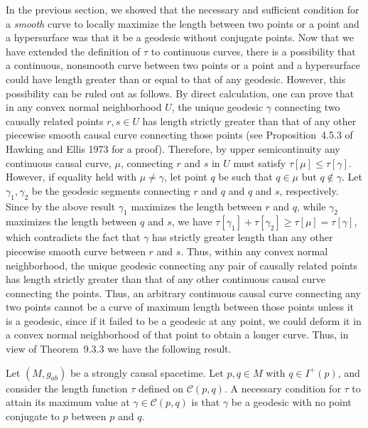 In the previous section, we showed that the necessary and sufficient condition for a
\emph{smooth} curve to locally maximize the length between two points or a point and a
hypersurface was that it be a geodesic without conjugate points. Now that we have
extended the definition of \(\tau\) to continuous curves, there is a possibility that a
continuous, nonsmooth curve between two points or a point and a hypersurface could
have length greater than or equal to that of any geodesic. However, this possibility
can be ruled out as follows. By direct calculation, one can prove that in any convex
normal neighborhood \(U\), the unique geodesic \(\gamma\) connecting two causally
related points \(r,s\in U\) has length strictly greater than that of any other piecewise
smooth causal curve connecting those points (see Proposition~4.5.3 of Hawking and
Ellis 1973 for a proof). Therefore, by upper semicontinuity any continuous causal
curve, \(\mu\), connecting \(r\) and \(s\) in \(U\) must satisfy
\(\tau[\mu]\leq\tau[\gamma]\). However, if equality held with \(\mu\ne\gamma\), let
point \(q\) be such that \(q\in\mu\) but \(q\notin\gamma\). Let \(\gamma_1,\gamma_2\)
be the geodesic segments connecting \(r\) and \(q\) and \(q\) and \(s\), respectively.
Since by the above result \(\gamma_1\) maximizes the length between \(r\) and \(q\),
while \(\gamma_2\) maximizes the length between \(q\) and \(s\), we have
\(\tau[\gamma_1]+\tau[\gamma_2]\geq\tau[\mu]=\tau[\gamma]\), which contradicts the
fact that \(\gamma\) has strictly greater length than any other piecewise smooth curve
between \(r\) and \(s\). Thus, within any convex normal neighborhood, the unique
geodesic connecting any pair of causally related points has length strictly greater
than that of any other continuous causal curve connecting the points. Thus, an
arbitrary continuous causal curve connecting any two points cannot be a curve of
maximum length between those points unless it is a geodesic, since if it failed to be
a geodesic at any point, we could deform it in a convex normal neighborhood of that
point to obtain a longer curve. Thus, in view of Theorem~9.3.3 we have the following
result.

\begin{theorem}\label{thm:9.4.2}
Let \((M,g_{ab})\) be a strongly causal spacetime. Let \(p,q\in M\) with
\(q\in I^+(p)\), and consider the length function \(\tau\) defined on
\(\mathcal C(p,q)\). A necessary condition for \(\tau\) to attain its maximum value at
\(\gamma\in\mathcal C(p,q)\) is that \(\gamma\) be a geodesic with no point conjugate
to \(p\) between \(p\) and \(q\).
\end{theorem}

